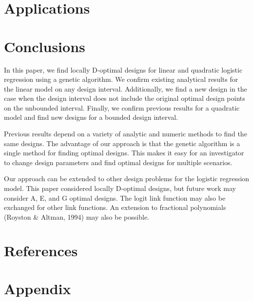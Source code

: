 \documentclass[11pt,a4paper]{article}
\begin{document}
\section{Applications}
\section{Conclusions}
In this paper, we find locally D-optimal designs for linear and quadratic logistic regression using a genetic algorithm. We confirm existing analytical results for the linear model on any design interval. Additionally, we find a new design in the case when the design interval does not include the original optimal design points on the unbounded interval. Finally, we confirm previous results for a quadratic model and find new designs for a bounded design interval.

 Previous results depend on a variety of analytic and numeric methods to find the same designs. The advantage of our approach is that the genetic algorithm is a single method for finding optimal designs. This makes it easy for an investigator to change design parameters and find optimal designs for multiple scenarios.
 
Our approach can be extended to other design problems for the logistic regression model. This paper considered locally D-optimal designs, but future work may consider A, E, and G optimal designs. The logit link function may also be exchanged for other link functions. An extension to fractional polynomials (Royston \& Altman, 1994) may also be possible.
 
 
\section{References}
\section{Appendix}
\end{document}

